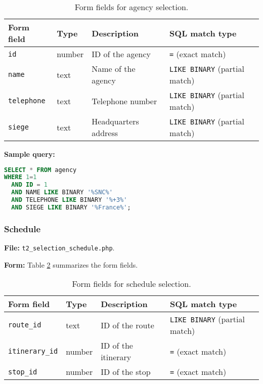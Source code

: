 \documentclass[a4paper, 12pt]{article}
\begin{document}
\begin{table}[H]
    \centering
    \footnotesize
    \caption{Form fields for agency selection.}
    \label{tab:p3-t2-agency-form-fields}
    \begin{tabular}{llll}
        \toprule
        \textbf{Form field} & \textbf{Type} & \textbf{Description} & \textbf{SQL match type} \\
        \midrule
        \texttt{id}         & number        & ID of the agency                            & \texttt{=} (exact match) \\
        \texttt{name}       & text          & Name of the agency                          & \texttt{LIKE BINARY} (partial match) \\
        \texttt{telephone}  & text          & Telephone number                            & \texttt{LIKE BINARY} (partial match) \\
        \texttt{siege}      & text          & Headquarters address                        & \texttt{LIKE BINARY} (partial match) \\
        \bottomrule
    \end{tabular}
\end{table}

\newpage

\textbf{Sample query:}
\begin{lstlisting}[language=SQL]
SELECT * FROM agency
WHERE 1=1
  AND ID = 1
  AND NAME LIKE BINARY '%SNC%'
  AND TELEPHONE LIKE BINARY '%+3%'
  AND SIEGE LIKE BINARY '%France%';
\end{lstlisting}

\subsubsection{Schedule}

\textbf{File:} \texttt{t2\_selection\_schedule.php}.

\textbf{Form:} Table \ref{tab:p3-t2-schedule-form-fields} summarizes the form fields.

\begin{table}[H]
    \centering
    \footnotesize
    \caption{Form fields for schedule selection.}
    \label{tab:p3-t2-schedule-form-fields}
    \begin{tabular}{llll}
        \toprule
        \textbf{Form field} & \textbf{Type} & \textbf{Description} & \textbf{SQL match type} \\
        \midrule
        \texttt{route\_id}     & text          & ID of the route         & \texttt{LIKE BINARY} (partial match) \\
        \texttt{itinerary\_id} & number        & ID of the itinerary     & \texttt{=} (exact match) \\
        \texttt{stop\_id}      & number        & ID of the stop          & \texttt{=} (exact match) \\
        \bottomrule
    \end{tabular}
\end{table}
\end{document}
